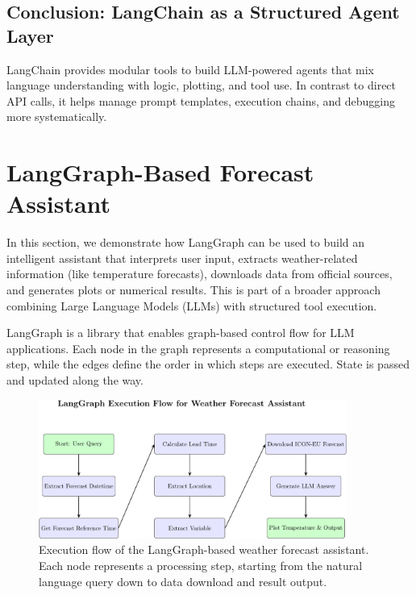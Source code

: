 \subsection*{Conclusion: LangChain as a Structured Agent Layer}

LangChain provides modular tools to build LLM-powered agents that mix language understanding with logic, plotting, and tool use. In contrast to direct API calls, it helps manage prompt templates, execution chains, and debugging more systematically.


%
\section{LangGraph-Based Forecast Assistant}

In this section, we demonstrate how LangGraph can be used to build an intelligent assistant that interprets user input, extracts weather-related information (like temperature forecasts), downloads data from official sources, and generates plots or numerical results. This is part of a broader approach combining Large Language Models (LLMs) with structured tool execution.

LangGraph is a library that enables graph-based control flow for LLM applications. Each node in the graph represents a computational or reasoning step, while the edges define the order in which steps are executed. State is passed and updated along the way.

%
\begin{figure}[htbp]
	\centering
	\includegraphics[width=0.9\textwidth]{images/langgraph_weatherforecast2.pdf}
	\caption{Execution flow of the LangGraph-based weather forecast assistant. Each node represents a processing step, starting from the natural language query down to data download and result output.}
	\label{fig:langgraph-weather}
\end{figure}

